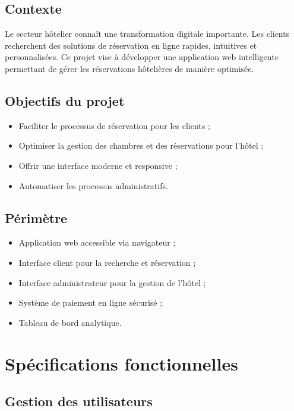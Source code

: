 \documentclass[12pt,a4paper]{report}
\begin{document}
\section{Contexte}

Le secteur hôtelier connaît une transformation digitale importante. Les clients recherchent
des solutions de réservation en ligne rapides, intuitives et personnalisées. Ce projet vise à
développer une application web intelligente permettant de gérer les réservations hôtelières
de manière optimisée.

\section{Objectifs du projet}

\begin{itemize}
  \item Faciliter le processus de réservation pour les clients ;
  \item Optimiser la gestion des chambres et des réservations pour l'hôtel ;
  \item Offrir une interface moderne et responsive ;
  \item Automatiser les processus administratifs.
\end{itemize}

\section{Périmètre}

\begin{itemize}
  \item Application web accessible via navigateur ;
  \item Interface client pour la recherche et réservation ;
  \item Interface administrateur pour la gestion de l'hôtel ;
  \item Système de paiement en ligne sécurisé ;
  \item Tableau de bord analytique.
\end{itemize}

\chapter{Spécifications fonctionnelles}

\section{Gestion des utilisateurs}
\end{document}
